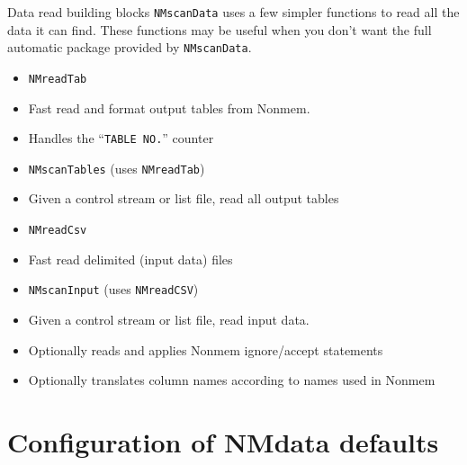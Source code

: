 \documentclass[
  8pt,
  ignorenonframetext,
  aspectratio=169]{beamer}
\providecommand{\tightlist}{%
  \setlength{\itemsep}{0pt}\setlength{\parskip}{0pt}}
\begin{document}
\begin{frame}[fragile]{Data read building blocks}
\protect\hypertarget{data-read-building-blocks}{}
\texttt{NMscanData} uses a few simpler functions to read all the data it
can find. These functions may be useful when you don't want the full
automatic package provided by \texttt{NMscanData}.

\begin{itemize}
\tightlist
\item
  \texttt{NMreadTab}
\item
  Fast read and format output tables from Nonmem.
\item
  Handles the ``\texttt{TABLE\ NO.}'' counter
\item
  \texttt{NMscanTables} (uses \texttt{NMreadTab})
\item
  Given a control stream or list file, read all output tables
\item
  \texttt{NMreadCsv}
\item
  Fast read delimited (input data) files
\item
  \texttt{NMscanInput} (uses \texttt{NMreadCSV})
\item
  Given a control stream or list file, read input data.
\item
  Optionally reads and applies Nonmem ignore/accept statements
\item
  Optionally translates column names according to names used in Nonmem
\end{itemize}
\end{frame}

\hypertarget{configuration-of-nmdata-defaults}{%
\section{Configuration of NMdata
defaults}\label{configuration-of-nmdata-defaults}}
\end{document}
